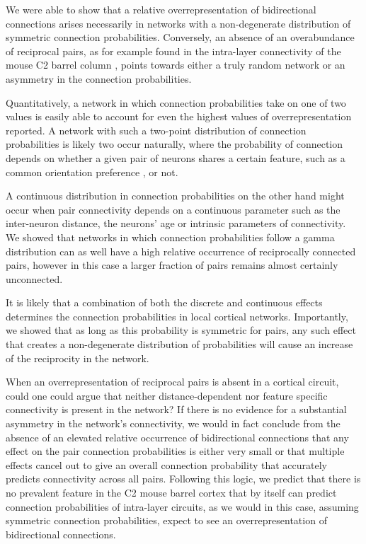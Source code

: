 
We were able to show that a relative overrepresentation of bidirectional connections arises necessarily in networks with a non-degenerate distribution of symmetric connection probabilities. Conversely, an absence of an overabundance of reciprocal pairs, as for example found in the intra-layer connectivity of the mouse C2 barrel column \cite{Lefort2009}, points towards either a truly random network or an asymmetry in the connection probabilities. 

Quantitatively, a network in which connection probabilities take on one of two values is easily able to account for even the highest values of overrepresentation reported. A network with such a two-point distribution of connection probabilities is likely two occur naturally, where the probability of connection depends on whether a given pair of neurons shares a certain feature, such as a common orientation preference \cite{Lee2016}, or not. 

A continuous distribution in connection probabilities on the other hand might occur when pair connectivity depends on a continuous parameter such as the inter-neuron distance, the neurons' age or intrinsic parameters of connectivity. We showed that networks in which connection probabilities follow a gamma distribution can as well have a high relative occurrence of reciprocally connected pairs, however in this case a larger fraction of pairs remains almost certainly unconnected.

It is likely that a combination of both the discrete and continuous effects determines the connection probabilities in local cortical networks. Importantly, we showed that as long as this probability is symmetric for pairs, any such effect that creates a non-degenerate distribution of probabilities will cause an increase of the reciprocity in the network.

When an overrepresentation of reciprocal pairs is absent in a cortical circuit, could one could argue that neither distance-dependent nor feature specific connectivity is present in the network? If there is no evidence for a substantial asymmetry in the network's connectivity, we would in fact conclude from the absence of an elevated relative occurrence of bidirectional connections that any effect on the pair connection probabilities is either very small or that multiple effects cancel out to give an overall connection probability that accurately predicts connectivity across all pairs. Following this logic, we predict that there is no prevalent feature in the C2 mouse barrel cortex that by itself can predict connection probabilities of intra-layer circuits, as we would in this case, assuming symmetric connection probabilities, expect to see an overrepresentation of bidirectional connections.

